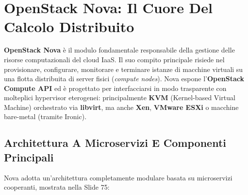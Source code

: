 \documentclass[11pt, a4paper]{article}
\begin{document}
\newpage

\section{OpenStack Nova: Il Cuore Del Calcolo Distribuito}

\textbf{OpenStack Nova} è il modulo fondamentale responsabile della gestione delle risorse computazionali del cloud IaaS. Il suo compito principale risiede nel provisionare, configurare, monitorare e terminare istanze di macchine virtuali su una flotta distribuita di server fisici (\emph{compute nodes}). Nova espone l'\textbf{OpenStack Compute API} ed è progettato per interfacciarsi in modo trasparente con molteplici hypervisor eterogenei: principalmente \textbf{KVM} (Kernel-based Virtual Machine) orchestrato via \textbf{libvirt}, ma anche \textbf{Xen}, \textbf{VMware ESXi} o macchine bare-metal (tramite Ironic).


\subsection{Architettura A Microservizi E Componenti Principali}

Nova adotta un'architettura completamente modulare basata su microservizi cooperanti, mostrata nella Slide 75:

\end{document}
